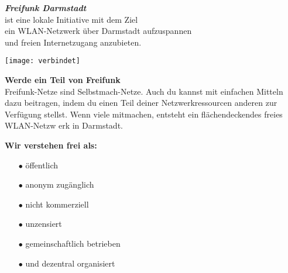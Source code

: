 \documentclass[a4paper]{article}
\begin{document}
\thispagestyle{empty}

\begin{center}
\Huge \textit{\textbf{\textcolor{freifunkpink}{Freifunk Darmstadt}}} \\
\vspace{0.6cm}
\large ist eine lokale Initiative mit dem Ziel \\
\large ein WLAN-Netzwerk über Darmstadt aufzuspannen \\
\large und freien Internetzugang anzubieten.
\normalsize

\vspace{1.7cm}

\hspace*{-0.05 \paperwidth}\texttt{[image: verbindet]}
\end{center}

\vspace{0.8cm}

\begin{Row}
    \begin{Cell}{5}
    \textbf{Werde ein Teil von Freifunk} \\
Freifunk-Netze sind Selbstmach-Netze. Auch du kannst mit einfachen Mitteln dazu
 beitragen, indem du einen Teil deiner Netzwerkressourcen anderen zur Verfügung
 stellst. Wenn viele mitmachen, entsteht ein flächendeckendes freies WLAN-Netzw
erk in Darmstadt.
    \end{Cell}
    \begin{Cell}{4}
    \textbf{Wir verstehen frei als:} \vspace*{-0.18cm}
	\begin{itemize}
	   \item[\textcolor{freifunkpink}{\Large$\bullet$}] öffentlich \vspace*{-0.3cm}
	   \item[\textcolor{freifunkpink}{\Large$\bullet$}] anonym zugänglich \vspace*{-0.3cm}
	   \item[\textcolor{freifunkpink}{\Large$\bullet$}] nicht kommerziell \vspace*{-0.3cm}
	   \item[\textcolor{freifunkpink}{\Large$\bullet$}] unzensiert \vspace*{-0.3cm}
	   \item[\textcolor{freifunkpink}{\Large$\bullet$}] gemeinschaftlich betrieben\vspace*{-0.3cm}
	   \item[\textcolor{freifunkpink}{\Large$\bullet$}] und dezentral organisiert
	\end{itemize}
    \end{Cell}
\end{Row}
\newpage
\end{document}
